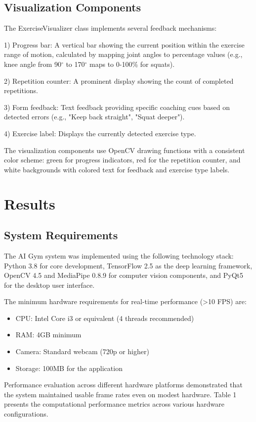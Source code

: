 \documentclass[11pt]{article}
\begin{document}
\subsection{Visualization Components}
The ExerciseVisualizer class implements several feedback mechanisms:

1) Progress bar: A vertical bar showing the current position within the exercise range of motion, calculated by mapping joint angles to percentage values (e.g., knee angle from 90$^\circ$ to 170$^\circ$ maps to 0-100\% for squats).

2) Repetition counter: A prominent display showing the count of completed repetitions.

3) Form feedback: Text feedback providing specific coaching cues based on detected errors (e.g., "Keep back straight", "Squat deeper").

4) Exercise label: Displays the currently detected exercise type.

The visualization components use OpenCV drawing functions with a consistent color scheme: green for progress indicators, red for the repetition counter, and white backgrounds with colored text for feedback and exercise type labels.

\section{Results}

\subsection{System Requirements}
The AI Gym system was implemented using the following technology stack: Python 3.8 for core development, TensorFlow 2.5 as the deep learning framework, OpenCV 4.5 and MediaPipe 0.8.9 for computer vision components, and PyQt5 for the desktop user interface.

The minimum hardware requirements for real-time performance (>10 FPS) are:
\begin{itemize}
\item CPU: Intel Core i3 or equivalent (4 threads recommended)
\item RAM: 4GB minimum
\item Camera: Standard webcam (720p or higher)
\item Storage: 100MB for the application
\end{itemize}

Performance evaluation across different hardware platforms demonstrated that the system maintained usable frame rates even on modest hardware. Table 1 presents the computational performance metrics across various hardware configurations.
\end{document}
